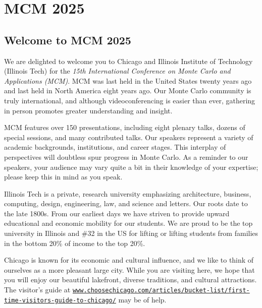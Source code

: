 \chapter{MCM 2025}


\section{Welcome to MCM 2025}

We are delighted to welcome you to Chicago and Illinois Institute of Technology (Illinois Tech) for the \emph{15th International Conference on Monte Carlo and Applications (MCM)}. MCM was last held in the United States twenty years ago and last held in North America eight years ago.  Our Monte Carlo community is truly international, and although videoconferencing is easier than ever, gathering in person promotes greater understanding and insight.

MCM features over 150 presentations, including eight plenary talks,  dozens of special sessions, and many contributed talks.  Our speakers represent a variety of academic backgrounds, institutions, and career stages.  This interplay of perspectives will doubtless spur progress in Monte Carlo.  As a reminder to our speakers, your audience may vary quite a bit in their knowledge of your expertise; please keep this in mind as you speak.

Illinois Tech is a private, research university emphasizing architecture, business, computing, design, engineering, law, and science and letters.  Our roots date to the late 1800s.  From our earliest days we have striven to provide upward educational and economic mobility for our students.  We are proud to be the top university in Illinois and \#32 in the US for lifting or lifting students from families in the bottom 20\% of income to the top 20\%.

Chicago is known for its economic and cultural influence, and we like to think of ourselves as a more pleasant large city.  
While you are visiting here, we hope that you will enjoy our beautiful lakefront, diverse traditions, and cultural attractions. The visitor's guide at \href{https://www.choosechicago.com/articles/bucket-list/first-time-visitors-guide-to-chicago/}{\nolinkurl{www.choosechicago.com/articles/bucket-list/first-time-visitors-guide-to-chicago/}} may be of help.

